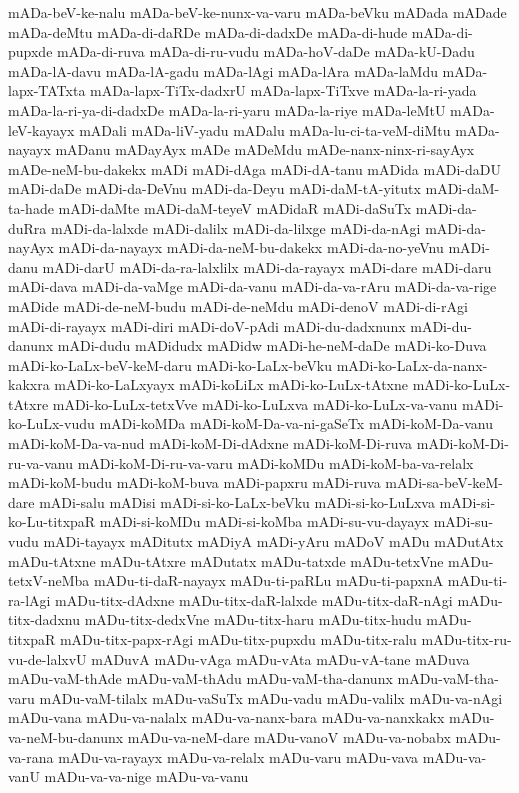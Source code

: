 {mADa-beV-ke-nalu
mADa-beV-ke-nunx-va-varu
mADa-beVku
mADada
mADade
mADa-deMtu
mADa-di-daRDe
mADa-di-dadxDe
mADa-di-hude
mADa-di-pupxde
mADa-di-ruva
mADa-di-ru-vudu
mADa-hoV-daDe
mADa-kU-Dadu
mADa-lA-davu
mADa-lA-gadu
mADa-lAgi
mADa-lAra
mADa-laMdu
mADa-lapx-TATxta
mADa-lapx-TiTx-dadxrU
mADa-lapx-TiTxve
mADa-la-ri-yada
mADa-la-ri-ya-di-dadxDe
mADa-la-ri-yaru
mADa-la-riye
mADa-leMtU
mADa-leV-kayayx
mADali
mADa-liV-yadu
mADalu
mADa-lu-ci-ta-veM-diMtu
mADa-nayayx
mADanu
mADayAyx
mADe
mADeMdu
mADe-nanx-ninx-ri-sayAyx
mADe-neM-bu-dakekx
mADi
mADi-dAga
mADi-dA-tanu
mADida
mADi-daDU
mADi-daDe
mADi-da-DeVnu
mADi-da-Deyu
mADi-daM-tA-yitutx
mADi-daM-ta-hade
mADi-daMte
mADi-daM-teyeV
mADidaR
mADi-daSuTx
mADi-da-duRra
mADi-da-lalxde
mADi-dalilx
mADi-da-lilxge
mADi-da-nAgi
mADi-da-nayAyx
mADi-da-nayayx
mADi-da-neM-bu-dakekx
mADi-da-no-yeVnu
mADi-danu
mADi-darU
mADi-da-ra-lalxlilx
mADi-da-rayayx
mADi-dare
mADi-daru
mADi-dava
mADi-da-vaMge
mADi-da-vanu
mADi-da-va-rAru
mADi-da-va-rige
mADide
mADi-de-neM-budu
mADi-de-neMdu
mADi-denoV
mADi-di-rAgi
mADi-di-rayayx
mADi-diri
mADi-doV-pAdi
mADi-du-dadxnunx
mADi-du-danunx
mADi-dudu
mADidudx
mADidw
mADi-he-neM-daDe
mADi-ko-Duva
mADi-ko-LaLx-beV-keM-daru
mADi-ko-LaLx-beVku
mADi-ko-LaLx-da-nanx-kakxra
mADi-ko-LaLxyayx
mADi-koLiLx
mADi-ko-LuLx-tAtxne
mADi-ko-LuLx-tAtxre
mADi-ko-LuLx-tetxVve
mADi-ko-LuLxva
mADi-ko-LuLx-va-vanu
mADi-ko-LuLx-vudu
mADi-koMDa
mADi-koM-Da-va-ni-gaSeTx
mADi-koM-Da-vanu
mADi-koM-Da-va-nud
mADi-koM-Di-dAdxne
mADi-koM-Di-ruva
mADi-koM-Di-ru-va-vanu
mADi-koM-Di-ru-va-varu
mADi-koMDu
mADi-koM-ba-va-relalx
mADi-koM-budu
mADi-koM-buva
mADi-papxru
mADi-ruva
mADi-sa-beV-keM-dare
mADi-salu
mADisi
mADi-si-ko-LaLx-beVku
mADi-si-ko-LuLxva
mADi-si-ko-Lu-titxpaR
mADi-si-koMDu
mADi-si-koMba
mADi-su-vu-dayayx
mADi-su-vudu
mADi-tayayx
mADitutx
mADiyA
mADi-yAru
mADoV
mADu
mADutAtx
mADu-tAtxne
mADu-tAtxre
mADutatx
mADu-tatxde
mADu-tetxVne
mADu-tetxV-neMba
mADu-ti-daR-nayayx
mADu-ti-paRLu
mADu-ti-papxnA
mADu-ti-ra-lAgi
mADu-titx-dAdxne
mADu-titx-daR-lalxde
mADu-titx-daR-nAgi
mADu-titx-dadxnu
mADu-titx-dedxVne
mADu-titx-haru
mADu-titx-hudu
mADu-titxpaR
mADu-titx-papx-rAgi
mADu-titx-pupxdu
mADu-titx-ralu
mADu-titx-ru-vu-de-lalxvU
mADuvA
mADu-vAga
mADu-vAta
mADu-vA-tane
mADuva
mADu-vaM-thAde
mADu-vaM-thAdu
mADu-vaM-tha-danunx
mADu-vaM-tha-varu
mADu-vaM-tilalx
mADu-vaSuTx
mADu-vadu
mADu-valilx
mADu-va-nAgi
mADu-vana
mADu-va-nalalx
mADu-va-nanx-bara
mADu-va-nanxkakx
mADu-va-neM-bu-danunx
mADu-va-neM-dare
mADu-vanoV
mADu-va-nobabx
mADu-va-rana
mADu-va-rayayx
mADu-va-relalx
mADu-varu
mADu-vava
mADu-va-vanU
mADu-va-va-nige
mADu-va-vanu
}
